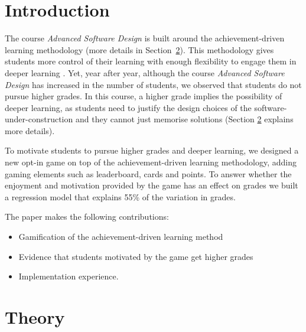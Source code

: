 \documentclass[sigconf]{acmart}
\begin{document}



\maketitle




\hypertarget{introduction}{%
\section{Introduction}\label{introduction}}

The course \textit{Advanced Software Design} is built around the
achievement-driven learning methodology \citep{wrigstad2017mastery}
(more details in Section~\ref{sec:theory}). This methodology gives
students more control of their learning with enough flexibility to
engage them in deeper learning \citep{biggsTang2011}. Yet, year after
year, although the course \textit{Advanced Software Design} has
increased in the number of students, we observed that students do not
pursue higher grades. In this course, a higher grade implies the
possibility of deeper learning, as students need to justify the design
choices of the software-under-construction and they cannot just memorise
solutions (Section \ref{sec:theory} explains more details).

To motivate students to pursue higher grades and deeper learning, we
designed a new opt-in game on top of the achievement-driven learning
methodology, adding gaming elements such as leaderboard, cards and
points. To answer whether the enjoyment and motivation provided by the
game has an effect on grades we built a regression model that explains
55\% of the variation in grades.

The paper makes the following contributions:

\begin{itemize}
\item Gamification of the achievement-driven learning method
\item Evidence that students motivated by the game get higher grades
\item Implementation experience.
\end{itemize}

\hypertarget{sec:theory}{%
\section{Theory}\label{sec:theory}}
\end{document}
